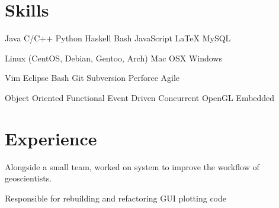 \documentclass[letterpaper]{deedy-resume} %
\begin{document}
\begin{minipage}[t]{0.66\textwidth} %

%

\section{Skills}
Java \textbullet{} C/C++ \textbullet{} Python \textbullet{} Haskell \textbullet{} Bash \textbullet{} JavaScript \textbullet{} \LaTeX \textbullet{} MySQL

Linux (CentOS, Debian, Gentoo, Arch) \textbullet{} Mac OSX \textbullet{} Windows

Vim \textbullet{} Eclipse \textbullet{} Bash \textbullet{} Git \textbullet{} Subversion \textbullet{} Perforce \textbullet{} Agile

Object Oriented \textbullet{} Functional \textbullet{} Event Driven
\textbullet{} Concurrent \textbullet{} OpenGL \textbullet{} Embedded

\section{Experience}

\sectionspace %

\vspace{\topsep} %
Alongside a small team, worked on system to improve the workflow of
geoscientists.
\vspace{\topsep} %
\vspace{\topsep} %
\begin{tightitemize}
\item Responsible for rebuilding and refactoring GUI plotting code
\end{tightitemize}

\sectionspace %



\end{minipage}
\end{document}
